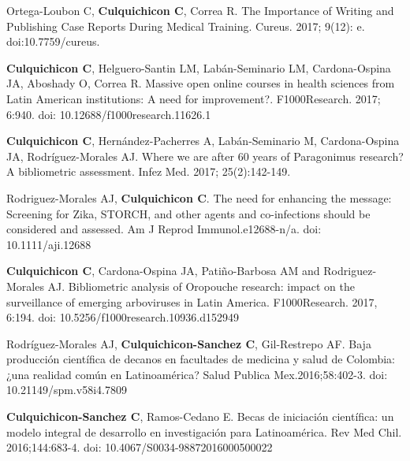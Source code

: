 \documentclass[10pt]{article}
\begin{document}
\begin{etaremune}
	\item Ortega-Loubon C, {\bf Culquichicon C}, Correa R. The Importance of Writing and Publishing Case Reports During Medical Training. Cureus. 2017; 9(12): e. doi:10.7759/cureus. \\
	\vspace{-0.23in}
	
	\item {\bf Culquichicon C}, Helguero-Santin LM, Labán-Seminario LM, Cardona-Ospina JA, Aboshady O, Correa R. Massive open online courses in health sciences from Latin American institutions: A need for improvement?. F1000Research. 2017; 6:940. doi: 10.12688/f1000research.11626.1 \\
	\vspace{-0.23in}
	
	\item {\bf Culquichicon C}, Hernández-Pacherres A, Labán-Seminario M, Cardona-Ospina JA, Rodríguez-Morales AJ. Where we are after 60 years of Paragonimus research? A bibliometric assessment. Infez Med. 2017; 25(2):142-149. \\
	\vspace{-0.23in}
	
	\item Rodriguez-Morales AJ, {\bf Culquichicon C}. The need for enhancing the message: Screening for Zika, STORCH, and other agents and co-infections should be considered and assessed. Am J Reprod Immunol.e12688-n/a. doi: 10.1111/aji.12688 \\
	\vspace{-0.23in}
	
	\item {\bf Culquichicon C}, Cardona-Ospina JA, Patiño-Barbosa AM and Rodriguez-Morales AJ. Bibliometric analysis of Oropouche research: impact on the surveillance of emerging arboviruses in Latin America. F1000Research. 2017, 6:194. doi: 10.5256/f1000research.10936.d152949 \\
	\vspace{-0.23in}
	
	\item Rodríguez-Morales AJ, {\bf Culquichicon-Sanchez C}, Gil-Restrepo AF. Baja producción científica de decanos en facultades de medicina y salud de Colombia:¿una realidad común en Latinoamérica? Salud Publica Mex.2016;58:402-3. doi: 10.21149/spm.v58i4.7809 \\
	\vspace{-0.23in}
	
	\item {\bf Culquichicon-Sanchez C}, Ramos-Cedano E. Becas de iniciación científica: un modelo integral de desarrollo en investigación para Latinoamérica. Rev Med Chil. 2016;144:683-4. doi: 10.4067/S0034-98872016000500022 \\
	\vspace{-0.23in}
	

\end{etaremune}
\end{document}
